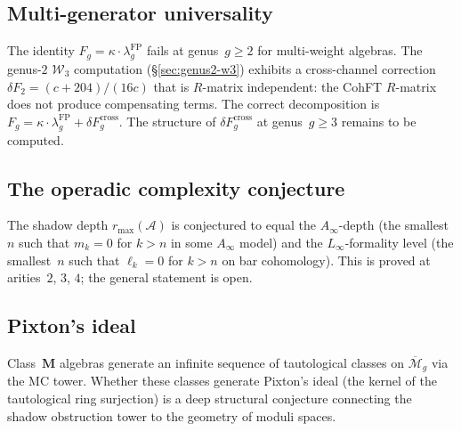\documentclass[11pt,reqno]{amsart}
\theoremstyle{definition}
\theoremstyle{remark}
\newcommand{\cA}{\mathcal{A}}
\newcommand{\cM}{\mathcal{M}}
\newcommand{\cW}{\mathcal{W}}
\numberwithin{equation}{section}
\begin{document}
\subsection{Multi-generator universality}

The identity $F_g = \kappa \cdot \lambda_g^{\mathrm{FP}}$ fails at
genus~$g \ge 2$ for multi-weight algebras.
The genus-$2$ $\cW_3$ computation
(\S\ref{sec:genus2-w3}) exhibits a cross-channel
correction $\delta F_2 = (c+204)/(16c)$ that is $R$-matrix
independent: the CohFT $R$-matrix does not produce compensating
terms. The correct decomposition is
$F_g = \kappa \cdot \lambda_g^{\mathrm{FP}} +
\delta F_g^{\mathrm{cross}}$.
The structure of $\delta F_g^{\mathrm{cross}}$ at
genus~$g \ge 3$ remains to be computed.

\subsection{The operadic complexity conjecture}

The shadow depth $r_{\max}(\cA)$ is conjectured to equal the
$A_\infty$-depth (the smallest~$n$ such that $m_k = 0$ for
$k > n$ in some $A_\infty$ model) and the $L_\infty$-formality
level (the smallest~$n$ such that $\ell_k = 0$ for $k > n$ on
bar cohomology). This is proved at arities~$2$, $3$, $4$; the
general statement is open.

\subsection{Pixton's ideal}

Class~$\mathbf{M}$ algebras generate an infinite sequence of
tautological classes on $\overline{\cM}_g$ via the MC tower.
Whether these classes generate Pixton's ideal (the kernel of
the tautological ring surjection) is a deep structural
conjecture connecting the shadow obstruction tower to the geometry of
moduli spaces.


\end{document}
